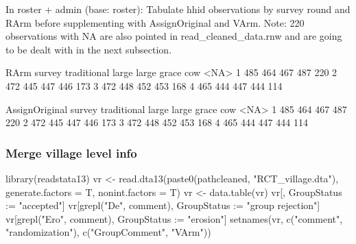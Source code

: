 In \textsf{roster + admin} (base: roster): Tabulate \textsf{hhid} observations by \textsf{survey} round and \textsf{RArm} before supplementing with \textsf{AssignOriginal} and \textsf{VArm}. Note: 220 observations with NA are also pointed in \textsf{read\_cleaned\_data.rnw} and are going to be dealt with in the next subsection.
\begin{Schunk}
\begin{Soutput}
      RArm
survey traditional large large grace cow <NA>
     1         485   464         467 487  220
     2         472   445         447 446  173
     3         472   448         452 453  168
     4         465   444         447 444  114
\end{Soutput}
\begin{Soutput}
      AssignOriginal
survey traditional large large grace cow <NA>
     1         485   464         467 487  220
     2         472   445         447 446  173
     3         472   448         452 453  168
     4         465   444         447 444  114
\end{Soutput}
\end{Schunk}

\subsubsection{Merge village level info}

\begin{Schunk}
\begin{Sinput}
library(readstata13)
vr <- read.dta13(paste0(pathcleaned, "RCT_village.dta"), 
  generate.factors = T, nonint.factors = T)
vr <- data.table(vr)
vr[, GroupStatus := "accepted"]
vr[grepl("De", comment), GroupStatus := "group rejection"]
vr[grepl("Ero", comment), GroupStatus := "erosion"]
setnames(vr, c("comment", "randomization"), c("GroupComment", "VArm"))
\end{Sinput}
\end{Schunk}

